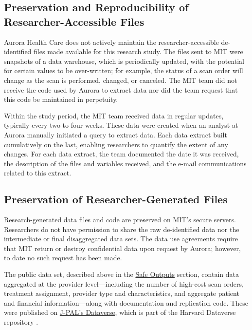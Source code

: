 \hypertarget{preservation-and-reproducibility-of-researcher-accessible-files-2}{%
\subsection{Preservation and Reproducibility of Researcher-Accessible Files}\label{preservation-and-reproducibility-of-researcher-accessible-files-2}}

Aurora Health Care does not actively maintain the researcher-accessible de-identified files made available for this research study. The files sent to MIT were snapshots of a data warehouse, which is periodically updated, with the potential for certain values to be over-written; for example, the status of a scan order will change as the scan is performed, changed, or canceled. The MIT team did not receive the code used by Aurora to extract data nor did the team request that this code be maintained in perpetuity.

Within the study period, the MIT team received data in regular updates, typically every two to four weeks. These data were created when an analyst at Aurora manually initiated a query to extract data. Each data extract built cumulatively on the last, enabling researchers to quantify the extent of any changes. For each data extract, the team documented the date it was received, the description of the files and variables received, and the e-mail communications related to this extract.

\hypertarget{preservation-of-researcher-generated-files}{%
\subsection{Preservation of Researcher-Generated Files}\label{preservation-of-researcher-generated-files}}

Research-generated data files and code are preserved on MIT's secure servers. Researchers do not have permission to share the raw de-identified data nor the intermediate or final disaggregated data sets. The data use agreements require that MIT return or destroy confidential data upon request by Aurora; however, to date no such request has been made.

The public data set, described above in the \protect\hyperlink{safe-outputs-7}{Safe Outputs} section, contain data aggregated at the provider level---including the number of high-cost scan orders, treatment assignment, provider type and characteristics, and aggregate patient and financial information---along with documentation and replication code. These were published on \href{https://doi.org/10.7910/DVN/BRKDVQ}{J-PAL's Dataverse}, which is part of the Harvard Dataverse repository \citep{doyle2018}.

